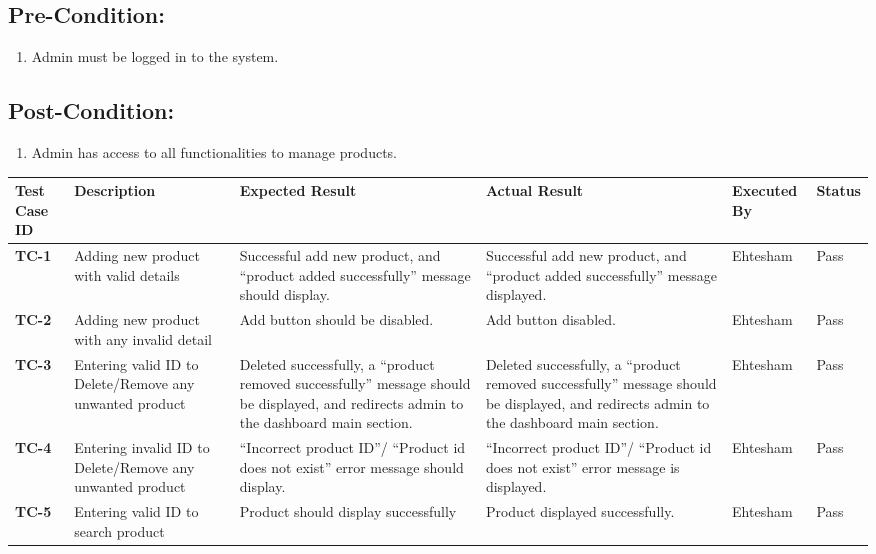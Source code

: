 \subsection{Pre-Condition:}
\begin{enumerate}
  \item Admin must be logged in to the system.
\end{enumerate}
\subsection{Post-Condition:}
\begin{enumerate}
  \item Admin has access to all functionalities to manage products.
\end{enumerate}

\begin{table}[H]
    \centering
   \begin{tabular}{ | m{1cm} | m{2.3cm}| m{3.3cm} | m{3.3cm} | m{1.7cm} | m{1.3cm} |}  
  \hline  \textbf{Test Case ID} &  \textbf{Description} &  \textbf{Expected Result} &  \textbf{Actual Result} &  \textbf{Executed By} &  \textbf{Status}  \\  \hline
  \textbf{TC-1} & Adding new product with valid details & Successful add new product, and “product added successfully” message should display. & Successful add new product, and “product added successfully” message displayed. & Ehtesham & Pass
  \\  \hline
  \textbf{TC-2} & Adding new product with any invalid detail & Add button should be disabled. & Add button disabled. & Ehtesham & Pass
  \\  \hline
  \textbf{TC-3} & Entering valid ID to Delete/Remove any unwanted product & Deleted successfully, a “product removed successfully” message should be displayed, and redirects admin to the dashboard main section. & Deleted successfully, a “product removed successfully” message should be displayed, and redirects admin to the dashboard main section. & Ehtesham & Pass
  \\  \hline
  \textbf{TC-4} & Entering invalid ID to Delete/Remove any unwanted product & “Incorrect product ID”/ “Product id does not exist” error message should display. & “Incorrect product ID”/ “Product id does not exist” error message is displayed. & Ehtesham & Pass
  \\  \hline
  \textbf{TC-5} & Entering valid ID to search product & Product should display successfully & Product displayed successfully. & Ehtesham & Pass

\end{tabular}
\end{table}
